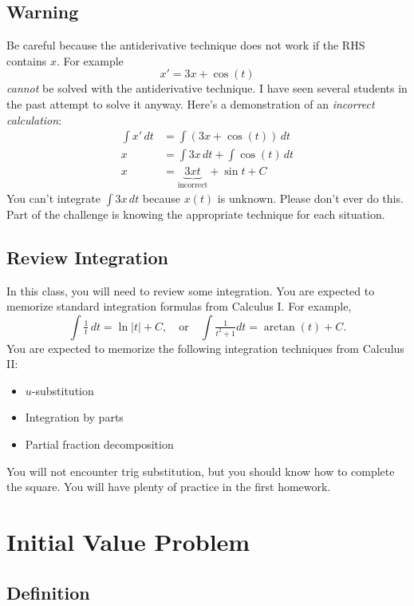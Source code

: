 \documentclass[11pt,letterpaper]{article}
\begin{document}
\subsection{Warning}

Be careful because the antiderivative technique does not work if the RHS contains $x$. For example 
\[
    x' = 3x+\cos(t)
\]
\textit{cannot} be solved with the antiderivative technique. I have seen several  students in the past attempt to solve it anyway. Here's a demonstration of an \emph{incorrect calculation}:
\begin{align*}
    \int x'\,dt &= \int(3x+\cos(t))\,dt\\
    x &= \int 3x\,dt +\int\cos(t)\,dt\\
    x &= \underbrace{ 3xt}_{\text{incorrect}} +\sin t+C
\end{align*}
You can't integrate $\int 3x \,dt$ because $x(t)$ is unknown. Please don't ever do this.
Part of the challenge is knowing the appropriate technique for each situation.

\subsection{Review Integration}
In this class, you will need to review some integration. You are expected to memorize standard integration formulas from Calculus I. For example, 
\[
\int \tfrac{1}{t} \,dt = \ln|t|+C, \quad \text{or} \quad \int \tfrac{1}{t^2+1}dt = \arctan(t)+C.    
\]
You are expected to memorize the following integration techniques from Calculus II:
\begin{itemize}
    \item $u$-substitution
    \item Integration by parts 
    \item Partial fraction decomposition 
\end{itemize}
You will not encounter trig substitution, but you should know how to complete the square. You will have plenty of practice in the first homework.

\section{Initial Value Problem}

\subsection{Definition}
\end{document}
